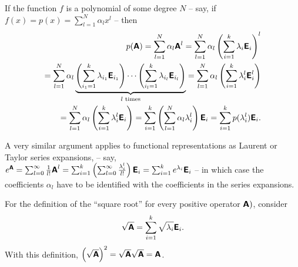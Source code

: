 {
\color{blue}
\bexample
If the function $f$ is a polynomial of some degree $N$ -- say, if
$f (x) = p(x) = \sum_{l=1}^N \alpha_l x^l$ -- then
\begin{equation}
\begin{split}
p (\textsf{\textbf{A}})
= \sum_{l=1}^N \alpha_l \textsf{\textbf{A}}^l
= \sum_{l=1}^N \alpha_l \left(\sum_{i=1}^k  \lambda_i   \textsf{\textbf{E}}_i\right)^l \\
= \sum_{l=1}^N \alpha_l \underbrace{\left(\sum_{{i_1}=1}^k \lambda_{i_1}  \textsf{\textbf{E}}_{i_1}\right)   \cdots  \left(\sum_{{i_l}=1}^k \lambda_{i_l}  \textsf{\textbf{E}}_{i_l}\right)}_{l \text{ times}}
= \sum_{l=1}^N \alpha_l \left(\sum_{i=1}^k  \lambda_i^l   \textsf{\textbf{E}}_i^l\right)   \\
= \sum_{l=1}^N \alpha_l \left(\sum_{i=1}^k  \lambda_i^l   \textsf{\textbf{E}}_i\right)
= \sum_{i=1}^k    \left( \sum_{l=1}^N \alpha_l \lambda_i^l   \right)  \textsf{\textbf{E}}_i
= \sum_{i=1}^k p ( \lambda_i^l   ) \textsf{\textbf{E}}_i  .
\end{split}
\end{equation}

A very similar argument applies to functional representations as Laurent or Taylor series expansions,
 -- say, $e^\textsf{\textbf{A}} = \sum_{l=0}^\infty   \frac{1}{l!} \textsf{\textbf{A}}^l= \sum_{i=1}^k  \left(   \sum_{l=0}^\infty \frac{\lambda_i^l}{l!}\right) \textsf{\textbf{E}}_i
= \sum_{i=1}^k  e^{\lambda_i} \textsf{\textbf{E}}_i $
-- in which case the coefficients $\alpha_l $ have to be identified with the coefficients in the  series expansions.



For the definition of the ``square root''
for every positive operator $\textsf{\textbf{A}})$, consider
\begin{equation}
\sqrt{\textsf{\textbf{A}}}=\sum_{i=1}^k \sqrt{\lambda_i}  \textsf{\textbf{E}}_i.
\end{equation}
With this definition,
$\left(\sqrt{\textsf{\textbf{A}}}\right)^2=
\sqrt{\textsf{\textbf{A}}}\sqrt{\textsf{\textbf{A}}}= {\textsf{\textbf{A}}}$.

}
